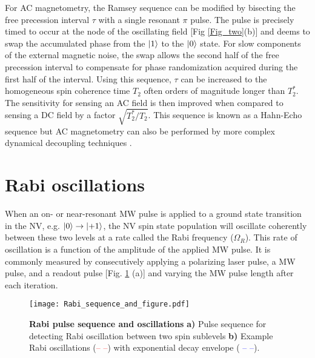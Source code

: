 For AC magnetometry, the Ramsey sequence can be modified by bisecting the free precession interval $\tau$ with a single resonant $\pi$ pulse. The pulse is precisely timed to occur at the node of the oscillating field [Fig \ref{Fig_two}(b)] and deems to swap the accumulated phase from the $\ket{1}$ to the $\ket{0}$ state. For slow components of the external magnetic noise, the swap allows the second half of the free precession interval to compensate for phase randomization acquired during the first half of the interval. Using this sequence, $\tau$ can be increased to the homogeneous spin coherence time $T_2$ often orders of magnitude longer than $T_2^*$. The sensitivity for sensing an AC field is then improved when compared to sensing a DC field by a factor $\sqrt{T_2^*/T_2}$. This sequence is known as a Hahn-Echo sequence but AC magnetometry can also be performed by more complex dynamical decoupling techniques \cite{carr1954effects, meiboom1958modified}.


\section{Rabi oscillations} \label{Rabi}

When an on- or near-resonant MW pulse is applied to a ground state transition in the NV, e.g. $\ket{0} \rightarrow \ket{+1}$, the NV spin state population will oscillate coherently between these two levels at a rate called the Rabi frequency ($\Omega_R$). This rate of oscillation is a function of the amplitude of the applied MW pulse. It is commonly measured by consecutively applying a polarizing laser pulse, a MW pulse, and a readout pulse [Fig. \ref{Fig1_3} (a)] and varying the MW pulse length after each iteration. 

\begin{figure}[t!]
\centering
\texttt{[image: Rabi\_sequence\_and\_figure.pdf]}  
\caption{\textbf{Rabi pulse sequence and oscillations} \textbf{a)} Pulse sequence for detecting Rabi oscillation between two spin sublevels \textbf{b)} Example Rabi oscillations (\textcolor{red}{-- --}) with exponential decay envelope (\textcolor{blue}{ -- --}).}
\label{Fig1_3}
\end{figure}

